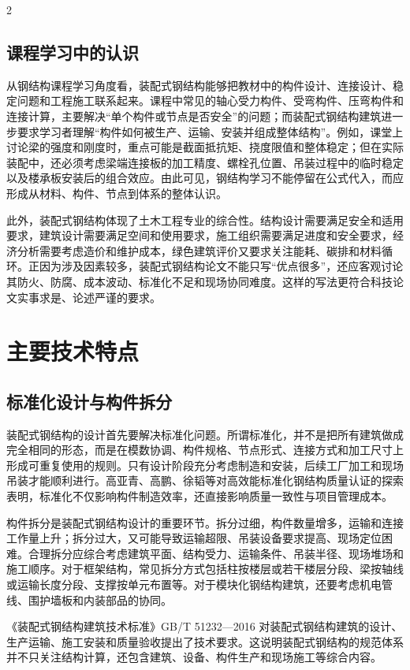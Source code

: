 ﻿\documentclass[UTF8,a4paper,10.5pt]{ctexart}
\newenvironment{bodytext}{\fontsize{10.5pt}{16pt}\selectfont\songti}{}
\begin{document}
\begin{bodytext}
\begin{multicols}{2}
\subsection{课程学习中的认识}

从钢结构课程学习角度看，装配式钢结构能够把教材中的构件设计、连接设计、稳定问题和工程施工联系起来。课程中常见的轴心受力构件、受弯构件、压弯构件和连接计算，主要解决“单个构件或节点是否安全”的问题；而装配式钢结构建筑进一步要求学习者理解“构件如何被生产、运输、安装并组成整体结构”。例如，课堂上讨论梁的强度和刚度时，重点可能是截面抵抗矩、挠度限值和整体稳定；但在实际装配中，还必须考虑梁端连接板的加工精度、螺栓孔位置、吊装过程中的临时稳定以及楼承板安装后的组合效应。由此可见，钢结构学习不能停留在公式代入，而应形成从材料、构件、节点到体系的整体认识。

此外，装配式钢结构体现了土木工程专业的综合性。结构设计需要满足安全和适用要求，建筑设计需要满足空间和使用要求，施工组织需要满足进度和安全要求，经济分析需要考虑造价和维护成本，绿色建筑评价又要求关注能耗、碳排和材料循环。正因为涉及因素较多，装配式钢结构论文不能只写“优点很多”，还应客观讨论其防火、防腐、成本波动、标准化不足和现场协同难度。这样的写法更符合科技论文实事求是、论述严谨的要求。

\section{主要技术特点}

\subsection{标准化设计与构件拆分}

装配式钢结构的设计首先要解决标准化问题。所谓标准化，并不是把所有建筑做成完全相同的形态，而是在模数协调、构件规格、节点形式、连接方式和加工尺寸上形成可重复使用的规则。只有设计阶段充分考虑制造和安装，后续工厂加工和现场吊装才能顺利进行。高亚青、高鹏、徐韬等对高效能标准化钢结构质量认证的探索表明，标准化不仅影响构件制造效率，还直接影响质量一致性与项目管理成本\cite{ref-r7}。

构件拆分是装配式钢结构设计的重要环节。拆分过细，构件数量增多，运输和连接工作量上升；拆分过大，又可能导致运输超限、吊装设备要求提高、现场定位困难。合理拆分应综合考虑建筑平面、结构受力、运输条件、吊装半径、现场堆场和施工顺序。对于框架结构，常见拆分方式包括柱按楼层或若干楼层分段、梁按轴线或运输长度分段、支撑按单元布置等。对于模块化钢结构建筑，还要考虑机电管线、围护墙板和内装部品的协同。

《装配式钢结构建筑技术标准》GB/T 51232—2016 对装配式钢结构建筑的设计、生产运输、施工安装和质量验收提出了技术要求\cite{ref-s2}。这说明装配式钢结构的规范体系并不只关注结构计算，还包含建筑、设备、构件生产和现场施工等综合内容。


\end{multicols}
\end{bodytext}
\end{document}
